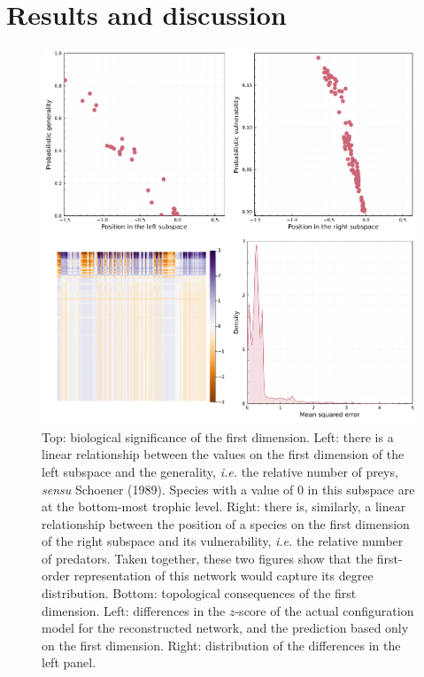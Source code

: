 \documentclass[11pt]{article}
\makeatletter
\def\maxwidth{\ifdim\Gin@nat@width>\linewidth\linewidth
\else\Gin@nat@width\fi}
\let\Oldincludegraphics\includegraphics
\renewcommand{\includegraphics}[1]{\Oldincludegraphics[width=\maxwidth]{#1}}
\makeatother
\begin{document}
\hypertarget{results-and-discussion}{%
\section{Results and discussion}\label{results-and-discussion}}

\begin{figure}
\hypertarget{fig:degree}{%
\centering
\includegraphics{figures/figure-degree.png}
\caption{Top: biological significance of the first dimension. Left:
there is a linear relationship between the values on the first dimension
of the left subspace and the generality, \emph{i.e.} the relative number
of preys, \emph{sensu} Schoener (1989). Species with a value of 0 in
this subspace are at the bottom-most trophic level. Right: there is,
similarly, a linear relationship between the position of a species on
the first dimension of the right subspace and its vulnerability,
\emph{i.e.} the relative number of predators. Taken together, these two
figures show that the first-order representation of this network would
capture its degree distribution. Bottom: topological consequences of the
first dimension. Left: differences in the \(z\)-score of the actual
configuration model for the reconstructed network, and the prediction
based only on the first dimension. Right: distribution of the
differences in the left panel.}\label{fig:degree}
}
\end{figure}
\end{document}
